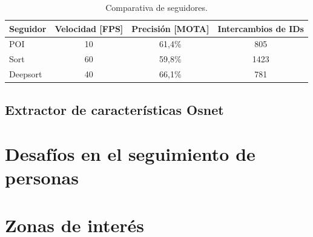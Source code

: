 \begin{table}[h]
	\centering
	\caption[Comparativa de seguidores]{Comparativa de seguidores.}
	\begin{tabular}{l c c c}    
		\toprule
		\textbf{Seguidor} & \textbf{Velocidad [FPS]}  & \textbf{Precisión [MOTA]} & \textbf{Intercambios de IDs} \\
		\midrule
		POI & 10 & 61,4\% & 805 \\
		Sort & 60 & 59,8\% & 1423 \\
		Deepsort & 40 & 66,1\% & 781 \\
		\bottomrule
		\hline
	\end{tabular}
	\label{tab:comparativaSeguidores}
\end{table}

\newpage

\subsection{Extractor de características Osnet}
\label{sec:exactorOsnet}


\section{Desafíos en el seguimiento de personas}
\label{sec:desafiosSeguimiento}


\section{Zonas de interés}
\label{sec:zonasInteres}

